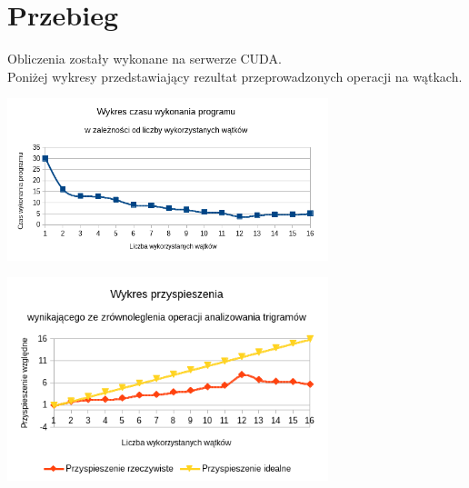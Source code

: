 \documentclass[a4paper,12pt]{article}
\begin{document}
\section*{Przebieg}
Obliczenia zostały wykonane na serwerze CUDA. \\



Poniżej wykresy przedstawiający rezultat przeprowadzonych operacji na wątkach.
\\
\begin{center}
\includegraphics[width=0.7\textwidth]{data/wykonanie.png}
\end{center}


\begin{center}
\includegraphics[width=0.7\textwidth]{data/przyspieszenie.png}
\end{center}
\end{document}
